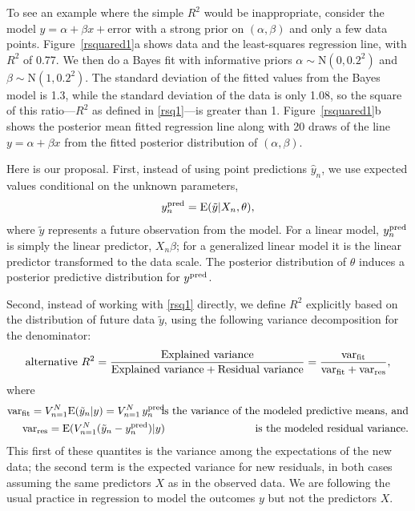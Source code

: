 \documentclass[11pt]{article}
\begin{document}
To see an example where the simple $R^2$ would be inappropriate, consider the model
$y = \alpha + \beta x+\mbox{error}$
with a strong prior on $(\alpha,\beta)$ and only a few data points.
Figure~\ref{rsquared1}a shows data and the least-squares regression line, with
$R^2$ of 0.77.  We then do a Bayes fit with informative priors
$\alpha \sim \mbox{N}(0,0.2^2)$ and $\beta \sim \mbox{N}(1,0.2^2)$.
The standard deviation of the fitted values from the Bayes model is 1.3, while
the standard deviation of the data is only 1.08, so the square of this
ratio---$R^2$ as defined in \eqref{rsq1}---is greater than 1.
Figure~\ref{rsquared1}b shows the posterior mean fitted regression line along
with 20 draws of the line $y = \alpha + \beta x$ from the fitted posterior
distribution of $(\alpha,\beta)$.

Here is our proposal.  First, instead of using point predictions $\hat{y}_n$, we use expected values conditional on the unknown parameters,
$$y^{\rm pred}_n=\mbox{E}(\tilde{y}|X_n,\theta),$$
where $\tilde{y}$ represents a future observation from the model. 
For a linear model, $y^{\rm pred}_n$ is simply the linear predictor, $X_n\beta$; for a generalized linear model it is the linear predictor transformed to the data scale.
The posterior distribution of $\theta$ induces a posterior predictive distribution for $y^{\rm pred}$.

Second, instead of working with \eqref{rsq1} directly, we define $R^2$ explicitly based on the distribution of future data $\tilde{y}$, using the following variance decomposition for the denominator:
%
\begin{equation}\label{rsq2}
\mbox{alternative } R^2 = \frac{\mbox{Explained variance}}{\mbox{Explained variance} + \mbox{Residual variance}} = \frac{{\rm var}_{\rm fit}}{{\rm var}_{\rm fit} + {\rm var}_{\rm res}},
\end{equation}
where
\begin{eqnarray}
\nonumber  {\rm var}_{\rm fit} = V_{n=1}^N  \mbox{E}(\tilde{y}_n|y) = V_{n=1}^N \,y^{\rm pred}_n && \!\!\!\!\!\!\!\! \mbox{is the variance of the modeled predictive means, and} \\
\nonumber  {\rm var}_{\rm res}=\mbox{E}( V_{n=1}^N (\tilde{y}_n - y^{\rm pred}_n)|y) && \!\!\!\!\!\!\!\! \mbox{is the modeled residual variance}.
\end{eqnarray}
This first of these quantites is the variance among the expectations of the new data; the second term is the expected variance for new residuals, in both cases assuming the same predictors $X$ as in the observed data. We are following the usual practice in regression to model the outcomes $y$ but not the predictors $X$. 
\end{document}
